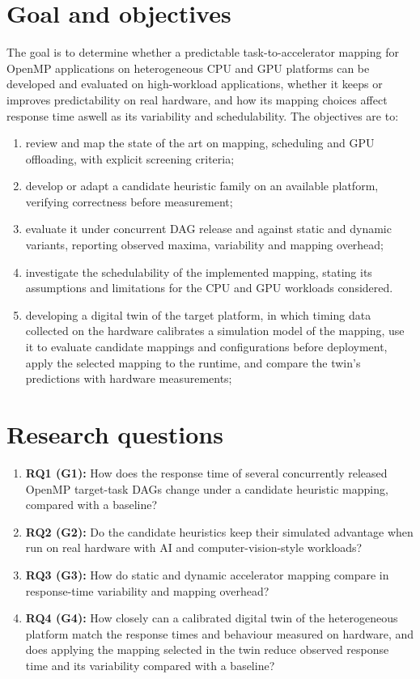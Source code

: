 \section{Goal and objectives}
\label{sec:chap1_goal}

The goal is to determine whether a predictable task-to-accelerator mapping for OpenMP applications on heterogeneous CPU and GPU platforms can be developed and evaluated on high-workload applications, whether it keeps or improves predictability on real hardware, and how its mapping choices affect response time aswell as its variability and schedulability. The objectives are to:
\begin{enumerate}
  \item review and map the state of the art on mapping, scheduling and GPU offloading, with explicit screening criteria;
  \item develop or adapt a candidate heuristic family on an available platform, verifying correctness before measurement;
  \item evaluate it under concurrent DAG release and against static and dynamic variants, reporting observed maxima, variability and mapping overhead;
  \item investigate the schedulability of the implemented mapping, stating its assumptions and limitations for the CPU and GPU workloads considered.
  \item developing a digital twin of the target platform, in which timing data collected on the hardware calibrates a simulation model of the mapping, use it to evaluate candidate mappings and configurations before deployment, apply the selected mapping to the runtime, and compare the twin's predictions with hardware measurements;
\end{enumerate}

\section{Research questions}
\label{sec:chap1_questions}

\begin{enumerate}
  \item \textbf{RQ1 (G1):} How does the response time of several concurrently released OpenMP target-task DAGs change under a candidate heuristic mapping, compared with a baseline?
  \item \textbf{RQ2 (G2):} Do the candidate heuristics keep their simulated advantage when run on real hardware with AI and computer-vision-style workloads?
  \item \textbf{RQ3 (G3):} How do static and dynamic accelerator mapping compare in response-time variability and mapping overhead?
  \item \textbf{RQ4 (G4):} How closely can a calibrated digital twin of the heterogeneous platform match the response times and behaviour measured on hardware, and does applying the mapping selected in the twin reduce observed response time and its variability compared with a baseline?
\end{enumerate}

